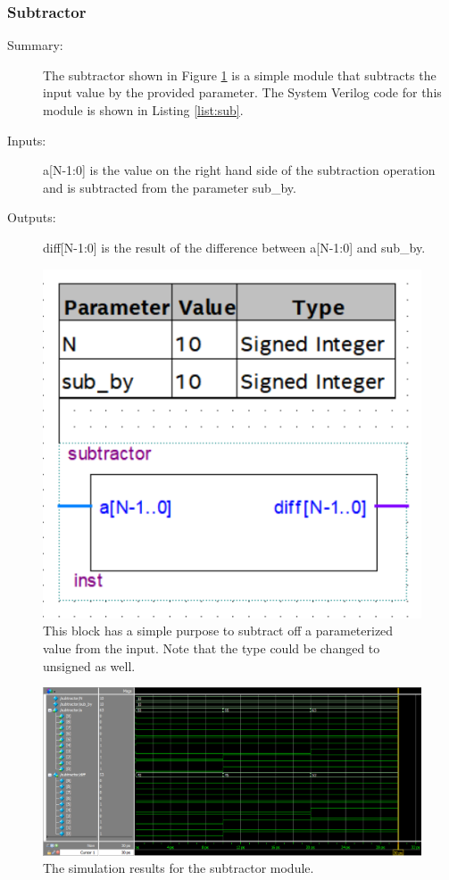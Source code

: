 \documentclass[a4paper]{article}
\begin{document}
\subsubsection{Subtractor}
\begin{description}
    \item[Summary: ] The subtractor shown in Figure \ref{fig:subtractor} is a simple module that subtracts the input value by the provided parameter. The System Verilog code for this module is shown in Listing \ref{list:sub}.
 
    \item[Inputs: ] a[N-1:0] is the value on the right hand side of the subtraction operation and is subtracted from the parameter sub\_by. 
    
    \item[Outputs: ] diff[N-1:0] is the result of the difference between a[N-1:0] and sub\_by.
\end{description}

\begin{figure}[H]
    \centering
    \includegraphics[width=.5\textwidth]{Images/subtractor.png}
    \caption{This block has a simple purpose to subtract off a parameterized value from the input. Note that the type could be changed to unsigned as well.}
    \label{fig:subtractor}
\end{figure}

\begin{figure}[H]
    \centering
    \includegraphics[width=5.91in]{Images/subsim.png}
    \caption{The simulation results for the subtractor module.}
    \label{fig:sub_sim}
\end{figure}
\end{document}
